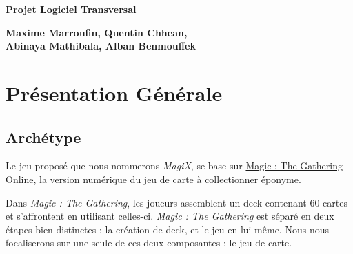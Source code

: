 \documentclass[a4paper,12pt]{article}
\begin{document}
\thispagestyle{empty}

\begin{titlepage}

\vspace*{2cm}

\begin{center}\textbf{\Huge Projet Logiciel Transversal}\end{center}{\Large \par}

\begin{center}\textbf{\large Maxime Marroufin, Quentin Chhean,\\Abinaya Mathibala, Alban Benmouffek}\end{center}{\large \par}

\vspace{2cm}


\clearpage

{\small
\tableofcontents
}

\end{titlepage}

\clearpage

\section{Présentation Générale}

\subsection{Archétype}

Le jeu proposé que nous nommerons \textit{MagiX}, se base sur \href{https://en.wikipedia.org/wiki/Magic\%3A\_The_Gathering\_Online}{Magic : The Gathering Online}, la version numérique du jeu de carte à collectionner éponyme.

Dans \emph{Magic : The Gathering}, les joueurs assemblent un deck contenant $60$ cartes et s'affrontent en utilisant celles-ci.
\emph{Magic : The Gathering} est séparé en deux étapes bien distinctes : la création de deck, et le jeu en lui-même.
Nous nous focaliserons sur une seule de ces deux composantes : le jeu de carte.
\end{document}
